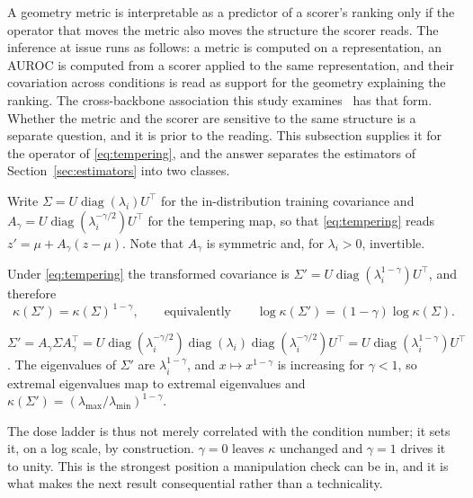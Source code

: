 A geometry metric is interpretable as a predictor of a scorer's ranking only if
the operator that moves the metric also moves the structure the scorer reads.
The inference at issue runs as follows: a metric is computed on a
representation, an AUROC is computed from a scorer applied to the same
representation, and their covariation across conditions is read as support for
the geometry explaining the ranking. The cross-backbone association this study
examines~\cite{yu2510dissecting} has that form. Whether the metric and the
scorer are sensitive to the same structure is a separate question, and it is
prior to the reading. This subsection
supplies it for the operator of \eqref{eq:tempering}, and the answer separates
the estimators of Section~\ref{sec:estimators} into two classes.

Write $\Sigma = U \operatorname{diag}(\lambda_i) U^{\top}$ for the
in-distribution training covariance and
$A_{\gamma} = U \operatorname{diag}(\lambda_i^{-\gamma/2}) U^{\top}$ for the
tempering map, so that \eqref{eq:tempering} reads
$z' = \mu + A_{\gamma}(z - \mu)$. Note that $A_{\gamma}$ is symmetric and, for
$\lambda_i > 0$, invertible.

\begin{proposition}
\label{prop:kappa}
Under \eqref{eq:tempering} the transformed covariance is
$\Sigma' = U \operatorname{diag}(\lambda_i^{1-\gamma}) U^{\top}$, and therefore
\begin{equation}
  \kappa(\Sigma') = \kappa(\Sigma)^{\,1-\gamma},
  \qquad\text{equivalently}\qquad
  \log \kappa(\Sigma') = (1-\gamma) \log \kappa(\Sigma).
  \label{eq:kappa-law}
\end{equation}
\end{proposition}

\begin{IEEEproof}
$\Sigma' = A_{\gamma} \Sigma A_{\gamma}^{\top}
 = U \operatorname{diag}(\lambda_i^{-\gamma/2}) \operatorname{diag}(\lambda_i)
     \operatorname{diag}(\lambda_i^{-\gamma/2}) U^{\top}
 = U \operatorname{diag}(\lambda_i^{1-\gamma}) U^{\top}$.
The eigenvalues of $\Sigma'$ are $\lambda_i^{1-\gamma}$, and
$x \mapsto x^{1-\gamma}$ is increasing for $\gamma < 1$, so extremal eigenvalues
map to extremal eigenvalues and
$\kappa(\Sigma') = (\lambda_{\max}/\lambda_{\min})^{1-\gamma}$.
\end{IEEEproof}

The dose ladder is thus not merely correlated with the condition number; it
sets it, on a log scale, by construction. $\gamma = 0$ leaves $\kappa$
unchanged and $\gamma = 1$ drives it to unity. This is the strongest position a
manipulation check can be in, and it is what makes the next result consequential
rather than a technicality.

